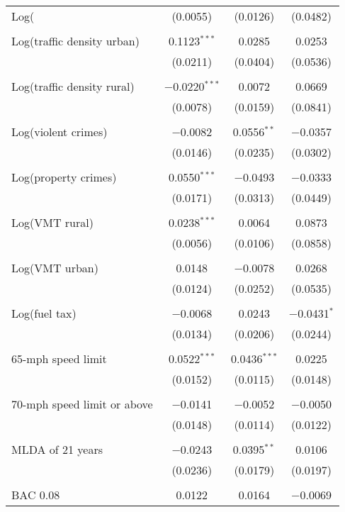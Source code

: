 \begin{table}[!htbp]
\begin{tabular}{@{\extracolsep{5pt}}lccc}
 Log(%
  & (0.0055) & (0.0126) & (0.0482) \\ 
  & & & \\ 
 Log(traffic density urban) & 0.1123$^{***}$ & 0.0285 & 0.0253 \\ 
  & (0.0211) & (0.0404) & (0.0536) \\ 
  & & & \\ 
 Log(traffic density rural) & $-$0.0220$^{***}$ & 0.0072 & 0.0669 \\ 
  & (0.0078) & (0.0159) & (0.0841) \\ 
  & & & \\ 
 Log(violent crimes) & $-$0.0082 & 0.0556$^{**}$ & $-$0.0357 \\ 
  & (0.0146) & (0.0235) & (0.0302) \\ 
  & & & \\ 
 Log(property crimes) & 0.0550$^{***}$ & $-$0.0493 & $-$0.0333 \\ 
  & (0.0171) & (0.0313) & (0.0449) \\ 
  & & & \\ 
 Log(VMT rural) & 0.0238$^{***}$ & 0.0064 & 0.0873 \\ 
  & (0.0056) & (0.0106) & (0.0858) \\ 
  & & & \\ 
 Log(VMT urban) & 0.0148 & $-$0.0078 & 0.0268 \\ 
  & (0.0124) & (0.0252) & (0.0535) \\ 
  & & & \\ 
 Log(fuel tax) & $-$0.0068 & 0.0243 & $-$0.0431$^{*}$ \\ 
  & (0.0134) & (0.0206) & (0.0244) \\ 
  & & & \\ 
 65-mph speed limit & 0.0522$^{***}$ & 0.0436$^{***}$ & 0.0225 \\ 
  & (0.0152) & (0.0115) & (0.0148) \\ 
  & & & \\ 
 70-mph speed limit or above & $-$0.0141 & $-$0.0052 & $-$0.0050 \\ 
  & (0.0148) & (0.0114) & (0.0122) \\ 
  & & & \\ 
 MLDA of 21 years & $-$0.0243 & 0.0395$^{**}$ & 0.0106 \\ 
  & (0.0236) & (0.0179) & (0.0197) \\ 
  & & & \\ 
 BAC 0.08 & 0.0122 & 0.0164 & $-$0.0069 \\ 

\end{tabular}
\end{table}
